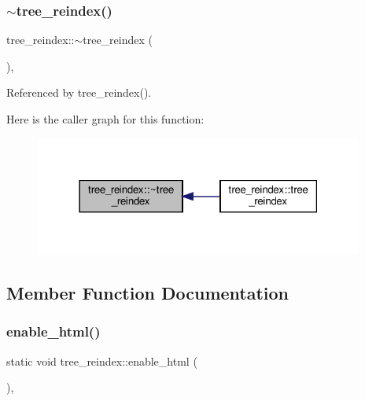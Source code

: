 \subsubsection{\texorpdfstring{$\sim$tree\+\_\+reindex()}{~tree\_reindex()}}
{\footnotesize\ttfamily tree\+\_\+reindex\+::$\sim$tree\+\_\+reindex (\begin{DoxyParamCaption}{ }\end{DoxyParamCaption})\hspace{0.3cm}{\ttfamily [override]}, {\ttfamily [default]}}



Referenced by tree\+\_\+reindex().

Here is the caller graph for this function\+:
\nopagebreak
\begin{figure}[H]
\begin{center}
\leavevmode
\includegraphics[width=306pt]{dd/d99/classtree__reindex_a06ddb155c756efea3cafb985519fb2cf_icgraph}
\end{center}
\end{figure}


\subsection{Member Function Documentation}
\mbox{\label{classtree__reindex_a80b53293354209465e092408863d3752}} 
\subsubsection{\texorpdfstring{enable\+\_\+html()}{enable\_html()}}
{\footnotesize\ttfamily static void tree\+\_\+reindex\+::enable\+\_\+html (\begin{DoxyParamCaption}{ }\end{DoxyParamCaption})\hspace{0.3cm}{\ttfamily [inline]}, {\ttfamily [static]}}



